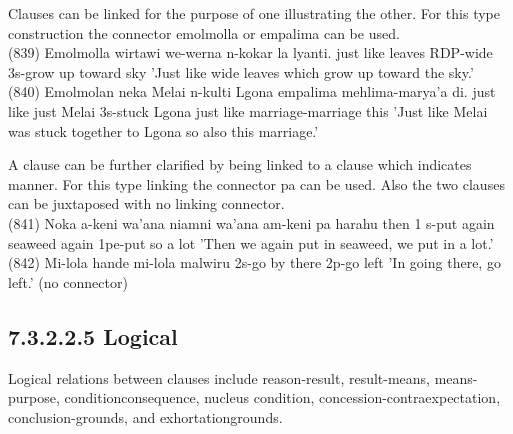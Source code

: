\documentclass[10pt]{article}
\begin{document}
Clauses can be linked for the purpose of one illustrating the other. For this type construction the connector emolmolla or empalima can be used.\\
(839) Emolmolla wirtawi we-werna n-kokar la lyanti. just like leaves RDP-wide 3s-grow up toward sky 'Just like wide leaves which grow up toward the sky.'\\
(840) Emolmolan neka Melai n-kulti Lgona empalima mehlima-marya’a di. just like just Melai 3s-stuck Lgona just like marriage-marriage this 'Just like Melai was stuck together to Lgona so also this marriage.'

A clause can be further clarified by being linked to a clause which indicates manner. For this type linking the connector pa can be used. Also the two clauses can be juxtaposed with no linking connector.\\
(841) Noka a-keni wa'ana niamni wa'ana am-keni pa harahu then 1 s-put again seaweed again 1pe-put so a lot 'Then we again put in seaweed, we put in a lot.'\\
(842) Mi-lola hande mi-lola malwiru 2s-go by there 2p-go left 'In going there, go left.' (no connector)

\subsection*{7.3.2.2.5 Logical}
Logical relations between clauses include reason-result, result-means, means-purpose, conditionconsequence, nucleus condition, concession-contraexpectation, conclusion-grounds, and exhortationgrounds.
\end{document}
